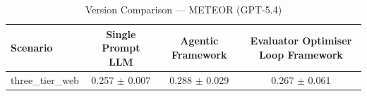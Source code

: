 \begin{table}[htbp]
\centering
\caption{Version Comparison — METEOR (GPT-5.4)}
\label{tab:version_meteor}
\begin{tabular}{lccc}
\toprule
Scenario & Single Prompt LLM & Agentic Framework & Evaluator Optimiser Loop Framework \\
\midrule
three\_tier\_web & 0.257 $\pm$ 0.007 & 0.288 $\pm$ 0.029 & 0.267 $\pm$ 0.061 \\
\bottomrule
\end{tabular}
\end{table}